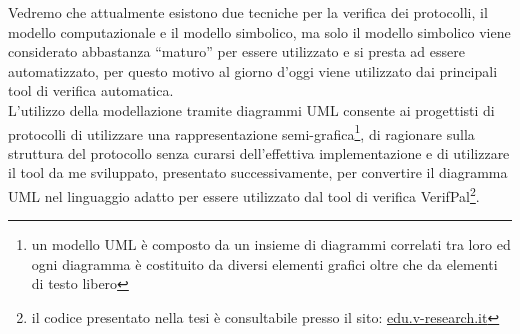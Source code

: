 Vedremo che attualmente esistono due tecniche per la verifica dei protocolli, il modello computazionale e il modello simbolico, ma solo il modello simbolico viene considerato abbastanza ``maturo'' per essere utilizzato e si presta ad essere automatizzato, per questo motivo al giorno d'oggi viene utilizzato dai principali tool di verifica automatica.\\
L'utilizzo della modellazione tramite diagrammi UML consente ai progettisti di protocolli di utilizzare una rappresentazione semi-grafica\footnote{un modello UML è composto da un insieme di diagrammi correlati tra loro ed ogni diagramma è costituito da diversi elementi grafici oltre che da elementi di testo libero}, di ragionare sulla struttura del protocollo senza curarsi dell'effettiva implementazione e di utilizzare il tool da me sviluppato, presentato successivamente, per convertire il diagramma UML nel linguaggio adatto per essere utilizzato dal tool di verifica VerifPal\footnote{il codice presentato nella tesi è consultabile presso il sito: \url{edu.v-research.it}}.\\
